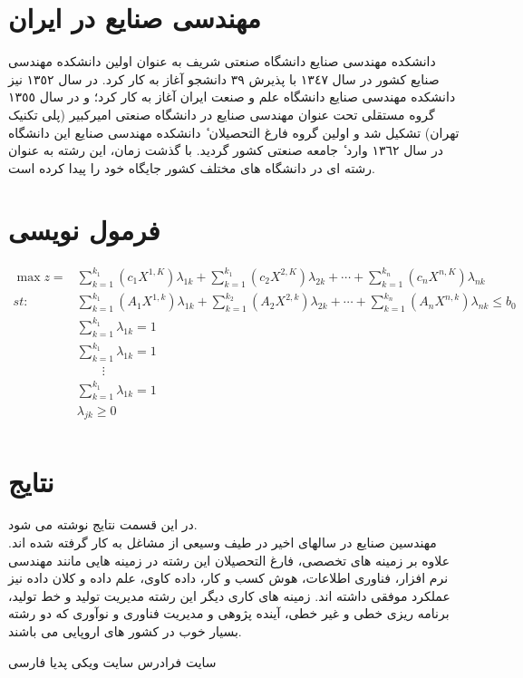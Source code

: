 \documentclass[12pt,onecolumn,a4paper]{article}
\begin{document}
\section{مهندسی صنایع در ایران}
دانشکده مهندسی صنایع دانشگاه صنعتی شریف به عنوان اولین دانشکده مهندسی صنایع کشور در سال ١٣٤٧ با پذیرش ٣٩ دانشجو آغاز به کار کرد.
در سال ١٣٥٢ نیز دانشکده مهندسی صنایع دانشگاه علم و صنعت ایران آغاز به کار کرد؛ و در سال ١٣٥٥ گروه مستقلی تحت عنوان مهندسی صنایع
در دانشگاه صنعتی امیرکبیر (پلی تکنیک تهران) تشکیل شد و اولین گروه فارغ التحصیلان ٔ دانشکده مهندسی صنایع این دانشگاه در سال ١٣٦٢ وارد
ٔ جامعه صنعتی کشور گردید. با گذشت زمان، این رشته به عنوان رشته ای در دانشگاه های مختلف کشور جایگاه خود را پیدا کرده است.










\section{فرمول نویسی}
\begin{align*}
\max z =&\sum_{k=1}^{k_1}(c_{1}X^{1,K})\lambda_{1k}+\sum_{k=1}^{k_1}(c_{2}X^{2,K})\lambda_{2k}+\cdots+\sum_{k=1}^{k_n}(c_{n}X^{n,K})\lambda_{nk} \\
st:\qquad&\sum_{k=1}^{k_1} (A_{1}X^{1,k})\lambda_{1k}+\sum_{k=1}^{k_2}(A_{2}X^{2,k})\lambda_{2k}+\cdots+\sum_{k=1}^{k_n}(A_{n}X^{n,k})\lambda_{nk}\leq b_{0} \\
&\sum_{k=1}^{k_1}\lambda_{1k}=1\\
&\sum_{k=1}^{k_1}\lambda_{1k}=1\\
&\qquad\vdots\\
&\sum_{k=1}^{k_1}\lambda_{1k}=1\\
&\lambda_{jk}\geq 0\\
\end{align*}



\section{نتایج}
در این قسمت نتایج نوشته می شود.\\
مهندسین صنایع در سالهای اخیر در طیف وسیعی از مشاغل به کار گرفته شده اند. علاوه بر زمینه های تخصصی، فارغ التحصیلان این رشته در
زمینه هایی مانند مهندسی نرم افزار، فناوری اطلاعات، هوش کسب و کار، داده کاوی، علم داده و کلان داده نیز عملکرد موفقی داشته اند. زمینه های
کاری دیگر این رشته مدیریت تولید و خط تولید، برنامه ریزی خطی و غیر خطی، آینده پژوهی و مدیریت فناوری و نوآوری که دو رشته بسیار خوب
در کشور های اروپایی می باشند.

\begin{thebibliography}{99}
\bibitem{}
سایت فرادرس
\bibitem{}
سایت ویکی پدیا فارسی




\end{thebibliography}
\end{document}

